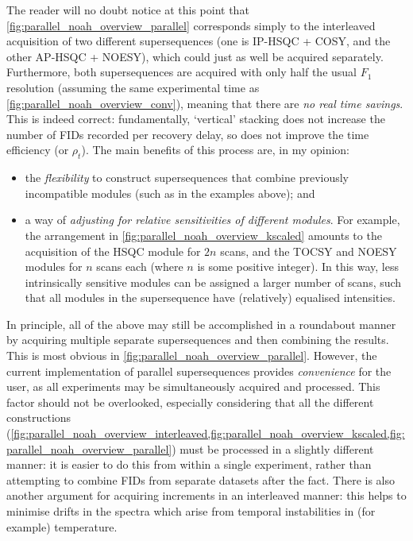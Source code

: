 The reader will no doubt notice at this point that \cref{fig:parallel_noah_overview_parallel} corresponds simply to the interleaved acquisition of two different supersequences (one is IP-HSQC + COSY, and the other AP-HSQC + NOESY), which could just as well be acquired separately.
Furthermore, both supersequences are acquired with only half the usual $F_1$ resolution (assuming the same experimental time as \cref{fig:parallel_noah_overview_conv}), meaning that there are \textit{no real time savings}.
This is indeed correct: fundamentally, `vertical' stacking does not increase the number of FIDs recorded per recovery delay, so does not improve the time efficiency (or $\rho_t$).
The main benefits of this process are, in my opinion:
\begin{itemize}
    \item the \textit{flexibility} to construct supersequences that combine previously incompatible modules (such as in the examples above); and
    \item a way of \textit{adjusting for relative sensitivities of different modules}.
        For example, the arrangement in \cref{fig:parallel_noah_overview_kscaled} amounts to the acquisition of the HSQC module for $2n$ scans, and the TOCSY and NOESY modules for $n$ scans each (where $n$ is some positive integer).
        In this way, less intrinsically sensitive modules can be assigned a larger number of scans, such that all modules in the supersequence have (relatively) equalised intensities.
\end{itemize}

In principle, all of the above may still be accomplished in a roundabout manner by acquiring multiple separate supersequences and then combining the results.
This is most obvious in \cref{fig:parallel_noah_overview_parallel}.
However, the current implementation of parallel supersequences provides \textit{convenience} for the user, as all experiments may be simultaneously acquired and processed.
This factor should not be overlooked, especially considering that all the different constructions (\cref{fig:parallel_noah_overview_interleaved,fig:parallel_noah_overview_kscaled,fig:parallel_noah_overview_parallel}) must be processed in a slightly different manner: it is easier to do this from within a single experiment, rather than attempting to combine FIDs from separate datasets after the fact.
There is also another argument for acquiring increments in an interleaved manner: this helps to minimise drifts in the spectra which arise from temporal instabilities in (for example) temperature.

